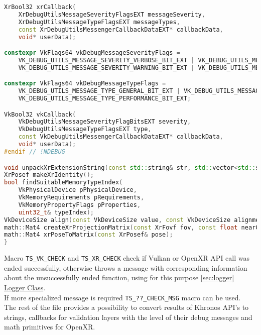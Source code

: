 \begin{itemize}
\begin{lstlisting}[language=c++, caption=Khronos Utils (./engine/src/khronos\_utils.h)]
XrBool32 xrCallback(
    XrDebugUtilsMessageSeverityFlagsEXT messageSeverity,
    XrDebugUtilsMessageTypeFlagsEXT messageTypes,
    const XrDebugUtilsMessengerCallbackDataEXT* callbackData,
    void* userData);

constexpr VkFlags64 vkDebugMessageSeverityFlags =
    VK_DEBUG_UTILS_MESSAGE_SEVERITY_VERBOSE_BIT_EXT | VK_DEBUG_UTILS_MESSAGE_SEVERITY_INFO_BIT_EXT |
    VK_DEBUG_UTILS_MESSAGE_SEVERITY_WARNING_BIT_EXT | VK_DEBUG_UTILS_MESSAGE_SEVERITY_ERROR_BIT_EXT;

constexpr VkFlags64 vkDebugMessageTypeFlags =
    VK_DEBUG_UTILS_MESSAGE_TYPE_GENERAL_BIT_EXT | VK_DEBUG_UTILS_MESSAGE_TYPE_VALIDATION_BIT_EXT |
    VK_DEBUG_UTILS_MESSAGE_TYPE_PERFORMANCE_BIT_EXT;

VkBool32 vkCallback(
    VkDebugUtilsMessageSeverityFlagBitsEXT severity,
    VkDebugUtilsMessageTypeFlagsEXT type,
    const VkDebugUtilsMessengerCallbackDataEXT* callbackData,
    void* userData);
#endif // !NDEBUG

void unpackXrExtensionString(const std::string& str, std::vector<std::string>& result);
XrPosef makeXrIdentity();
bool findSuitableMemoryTypeIndex(
    VkPhysicalDevice pPhysicalDevice,
    VkMemoryRequirements pRequirements,
    VkMemoryPropertyFlags pProperties,
    uint32_t& typeIndex);
VkDeviceSize align(const VkDeviceSize value, const VkDeviceSize alignment);
math::Mat4 createXrProjectionMatrix(const XrFovf fov, const float nearClip, const float farClip);
math::Mat4 xrPoseToMatrix(const XrPosef& pose);
}
\end{lstlisting}
Macro \texttt{TS\_VK\_CHECK} and \texttt{TS\_XR\_CHECK} check if Vulkan or OpenXR API call was ended successfully, otherwise throws a message with corresponding information about the unsuccessfully ended function, using for this purpose \hyperref[sec:logger]{\ref*{sec:logger} Logger Class}.\\
If more specialized message is required \texttt{TS\_??\_CHECK\_MSG} macro can be used.\\
The rest of the file provides a possibility to convert results of Khronos API's to strings, callbacks for validation layers with the level of their debug messages and math primitives for OpenXR.
\end{itemize}